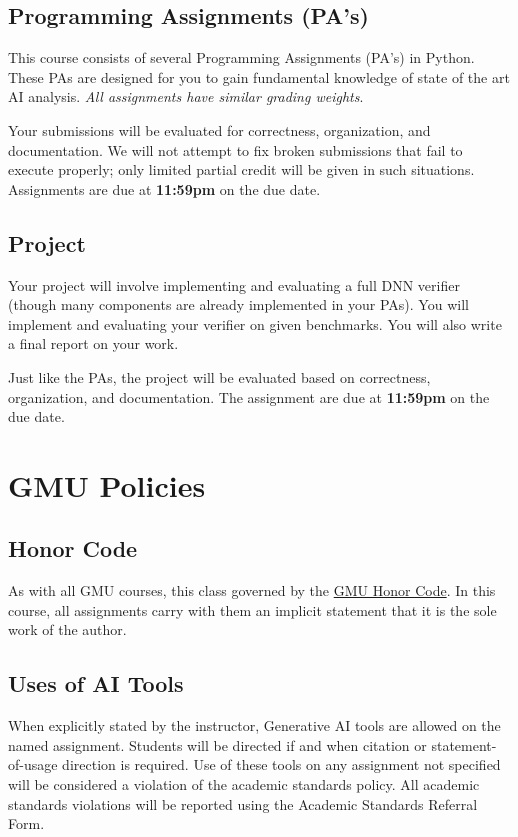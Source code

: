 \documentclass[11pt]{article}
\begin{document}
\subsection{Programming Assignments (PA's)}

This course consists of several Programming Assignments (PA's) in Python. These PAs are designed for you to gain fundamental knowledge of state of the art AI analysis. \emph{All assignments have similar grading weights}.

Your submissions will be evaluated for correctness,
organization, and documentation. We will not attempt to fix broken
submissions that fail to execute properly; only limited partial credit will be given in such situations. Assignments are due at \textbf{11:59pm} on the due date.

\subsection{Project}

Your project will involve implementing and evaluating a full DNN verifier (though many components are already implemented in your PAs). You will implement and evaluating your verifier on given benchmarks. You will also write a final report on your work.

Just like the PAs, the project will be evaluated based on correctness, organization, and documentation. The assignment are due at \textbf{11:59pm} on the due date.

\newpage
\section{GMU Policies}
\subsection{Honor Code}\label{sec:honor-code}

As with all GMU courses, this class governed by the \href{https://academicstandards.gmu.edu}{GMU Honor Code}. In this course, all assignments carry with them an implicit statement that it is the sole work of the author.

\subsection{Uses of AI Tools}

When explicitly stated by the instructor, Generative AI tools are allowed on the named assignment. Students will be directed if and when citation or statement-of-usage direction is required. Use of these tools on any assignment not specified will be considered a violation of the academic standards policy. All academic standards violations will be reported using the Academic Standards Referral Form. 
\end{document}
